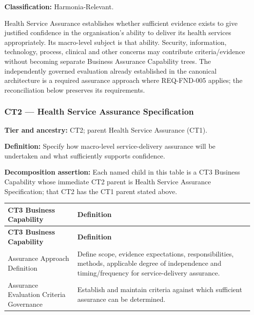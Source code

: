 \label{rad:business:1039}

\textbf{Classification:} Harmonia-Relevant.

\label{rad:business:1041}

Health Service Assurance establishes whether sufficient evidence exists to give justified confidence in the organisation’s ability to deliver its health services appropriately. Its macro-level subject is that ability. Security, information, technology, process, clinical and other concerns may contribute criteria/\allowbreak{}evidence without becoming separate Business Assurance Capability trees. The independently governed evaluation already established in the canonical architecture is a required assurance approach where REQ-FND-005 applies; the reconciliation below preserves its requirements.

\label{rad:business:1043}
\subsubsection*{CT2 — Health Service Assurance Specification}
\label{rad:business:1045}

\textbf{Tier and ancestry:} CT2; parent Health Service Assurance (CT1).

\label{rad:business:1047}

\textbf{Definition:} Specify how macro-level service-delivery assurance will be undertaken and what sufficiently supports confidence.

\label{rad:business:1049}

\textbf{Decomposition assertion:} Each named child in this table is a CT3 Business Capability whose immediate CT2 parent is Health Service Assurance Specification; that CT2 has the CT1 parent stated above.

\label{rad:business:1051}
\begingroup\small\setlength{\TableWidth}{\dimexpr\linewidth-4\tabcolsep-3\arrayrulewidth\relax}
\begin{longtable}{|>{\raggedright\arraybackslash}p{0.35\TableWidth}|>{\raggedright\arraybackslash}p{0.65\TableWidth}|}
\hline\rowcolor{TableHead}\textbf{CT3 Business Capability} & \textbf{Definition}\\\hline\endfirsthead
\hline\rowcolor{TableHead}\textbf{CT3 Business Capability} & \textbf{Definition}\\\hline\endhead
\hline\endfoot
Assurance Approach Definition & Define scope, evidence expectations, responsibilities, methods, applicable degree of independence and timing/\allowbreak{}frequency for service-delivery assurance.\\\hline
Assurance Evaluation Criteria Governance & Establish and maintain criteria against which sufficient assurance can be determined.\\\hline
\end{longtable}\endgroup
{}\label{rad:business:1056}

